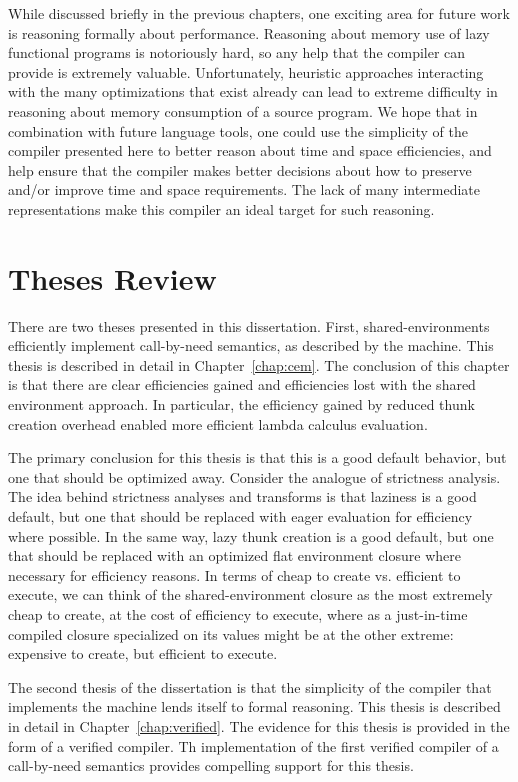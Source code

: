 While discussed briefly in the previous chapters, one exciting area for future
work is reasoning formally about performance. Reasoning about memory use of lazy
functional programs is notoriously hard, so any help that the compiler can
provide is extremely valuable. Unfortunately, heuristic approaches interacting
with the many optimizations that exist already can lead to extreme difficulty in
reasoning about memory consumption of a source program. We hope that in
combination with future language tools, one could use the simplicity of the
compiler presented here to better reason about time and space efficiencies, and
help ensure that the compiler makes better decisions about how to preserve
and/or improve time and space requirements. The lack of many intermediate
representations make this compiler an ideal target for such reasoning.

\section{Theses Review}

There are two theses presented in this dissertation. First, shared-environments
efficiently implement call-by-need semantics, as described by the \ce machine.
This thesis is described in detail in Chapter~\ref{chap:cem}. The conclusion of
this chapter is that there are clear efficiencies gained and efficiencies lost
with the shared environment approach. In particular, the efficiency gained by
reduced thunk creation overhead enabled more efficient lambda calculus
evaluation. 

The primary conclusion for this thesis is that this is a good default behavior,
but one that should be optimized away. Consider the analogue of strictness
analysis. The idea behind strictness analyses and transforms is that laziness is
a good default, but one that should be replaced with eager evaluation for
efficiency where possible. In the same way, lazy thunk creation is a good
default, but one that should be replaced with an optimized flat environment
closure where necessary for efficiency reasons. In terms of cheap to create vs. 
efficient to execute, we can think of the shared-environment closure as the most
extremely cheap to create, at the cost of efficiency to execute, where as a
just-in-time compiled closure specialized on its values might be at the other
extreme: expensive to create, but efficient to execute. 

The second thesis of the dissertation is that the simplicity of the compiler
that implements the \ce machine lends itself to formal reasoning. This thesis is
described in detail in Chapter~\ref{chap:verified}. The evidence for this thesis
is provided in the form of a verified compiler. Th implementation of the first
verified compiler of a call-by-need semantics provides compelling support for
this thesis. 

